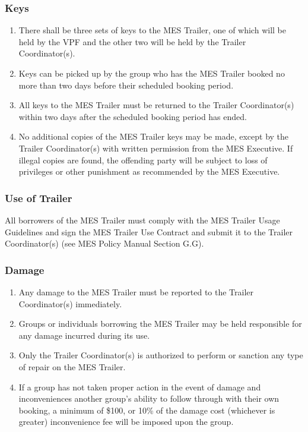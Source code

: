 \subsubsection{Keys}
\label{keys}
\begin{enumerate}
 \item
  There shall be three sets of keys to the MES Trailer, one of which will be held by the VPF and the other two will be held by the Trailer Coordinator(s).
 \item
  Keys can be picked up by the group who has the MES Trailer booked no more than two days before their scheduled booking period.
 \item
  All keys to the MES Trailer must be returned to the Trailer Coordinator(s) within two days after the scheduled booking period has ended.
 \item
  No additional copies of the MES Trailer keys may be made, except by the Trailer Coordinator(s) with written permission from the MES Executive. If illegal copies are found, the offending party will be subject to loss of privileges or other punishment as recommended by the MES Executive.

\end{enumerate}

\subsubsection{Use of Trailer}
\label{use-of-trailer}
All borrowers of the MES Trailer must comply with the MES Trailer Usage
Guidelines and sign the MES Trailer Use Contract and submit it to the
Trailer Coordinator(s) (see MES Policy Manual Section G.G). %

\subsubsection{Damage}
\label{damage}

\begin{enumerate}
 \item
  Any damage to the MES Trailer must be reported to the Trailer Coordinator(s) immediately.
 \item
  Groups or individuals borrowing the MES Trailer may be held responsible for any damage incurred during its use.
 \item
  Only the Trailer Coordinator(s) is authorized to perform or sanction any type of repair on the MES Trailer.
 \item
  If a group has not taken proper action in the event of damage and inconveniences another group's ability to follow through with their own booking, a minimum of \$100, or 10\% of the damage cost (whichever is greater) inconvenience fee will be imposed upon the group.

\end{enumerate}

